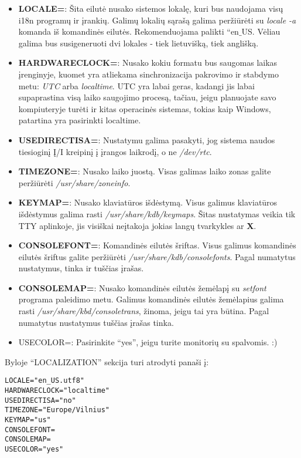\begin{itemize}
  \item \textbf{LOCALE=}: Šita eilutė nusako sistemos lokalę, kuri bus
    naudojama visų i18n programų ir įrankių. Galimų lokalių sąrašą
    galima peržiūrėti su \textsl{locale -a} komanda iš komandinės
    eilutės. Rekomenduojama palikti ``en$\_$US. Vėliau galima bus
    susigeneruoti dvi lokales - tiek lietuvišką, tiek anglišką.
  \item \textbf{HARDWARECLOCK=}: Nusako kokiu formatu bus saugomas
    laikas įrenginyje, kuomet yra atliekama sinchronizacija pakrovimo
    ir stabdymo metu: \textsl{UTC} arba \textsl{localtime}. UTC yra
    labai geras, kadangi jis labai supaprastina visą laiko saugojimo
    procesą, tačiau, jeigu planuojate savo kompiuteryje turėti ir
    kitas operacinės sistemas, tokias kaip Windows, patartina yra
    pasirinkti localtime.
  \item \textbf{USEDIRECTISA=}: Nustatymu galima pasakyti, jog sistema
    naudos tiesioginį Į/I kreipinį į įrangos laikrodį, o ne
    \textsl{/dev/rtc}.
  \item \textbf{TIMEZONE=}: Nusako laiko juostą. Visas galimas laiko
    zonas galite peržiūrėti \textsl{/usr/share/zoneinfo}.
  \item \textbf{KEYMAP=}: Nusako klaviatūros išdėstymą. Visus galimus
    klaviatūros išdėstymus galima rasti
    \textsl{/usr/share/kdb/keymaps}. Šitas nustatymas veikia tik TTY
    aplinkoje, jis visiškai neįtakoja jokias langų tvarkykles ar
    \textbf{X}.
  \item \textbf{CONSOLEFONT=}: Komandinės eilutės šriftas. Visus
    galimus komandinės eilutės šriftus galite peržiūrėti
    \textsl{/usr/share/kdb/consolefonts}. Pagal numatytus nustatymus,
    tinka ir tuščias įrašas.
  \item \textbf{CONSOLEMAP=}: Nusako komandinės eilutės žemėlapį su
    \textsl{setfont} programa paleidimo metu. Galimus komandinės
    eilutės žemėlapius galima rasti
    \textsl{/usr/share/kbd/consoletrans}, žinoma, jeigu tai yra
    būtina. Pagal numatytus nustatymus tuščias įrašas tinka.
  \item {USECOLOR=}: Pasirinkite ``yes'', jeigu turite monitorių su
    spalvomis. :)
\end{itemize}
Byloje ``LOCALIZATION'' sekcija turi atrodyti panaši į:
\begin{verbatim}
LOCALE="en_US.utf8"
HARDWARECLOCK="localtime"
USEDIRECTISA="no"
TIMEZONE="Europe/Vilnius"
KEYMAP="us"
CONSOLEFONT=
CONSOLEMAP=
USECOLOR="yes"
\end{verbatim}

